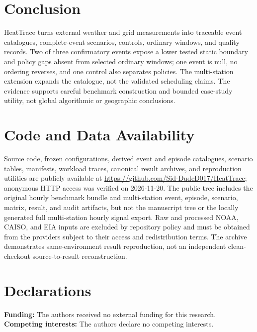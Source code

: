 \documentclass[pdflatex,sn-mathphys-num]{sn-jnl}
\begin{document}
\section{Conclusion}\label{sec:conclusion}

HeatTrace turns external weather and grid measurements into traceable event catalogues, complete-event scenarios, controls, ordinary windows, and quality records. Two of three confirmatory events expose a lower tested static boundary and policy gaps absent from selected ordinary windows; one event is null, no ordering reverses, and one control also separates policies. The multi-station extension expands the catalogue, not the validated scheduling claims. The evidence supports careful benchmark construction and bounded case-study utility, not global algorithmic or geographic conclusions.

\section*{Code and Data Availability}

Source code, frozen configurations, derived event and episode catalogues, scenario tables, manifests, workload traces, canonical result archives, and reproduction utilities are publicly available at \url{https://github.com/Sid-DudeD017/HeatTrace}; anonymous HTTP access was verified on 2026-11-20. The public tree includes the original hourly benchmark bundle and multi-station event, episode, scenario, matrix, result, and audit artifacts, but not the manuscript tree or the locally generated full multi-station hourly signal export. Raw and processed NOAA, CAISO, and EIA inputs are excluded by repository policy and must be obtained from the providers subject to their access and redistribution terms. The archive demonstrates same-environment result reproduction, not an independent clean-checkout source-to-result reconstruction.

\section*{Declarations}
\textbf{Funding:} The authors received no external funding for this research.
\textbf{Competing interests:} The authors declare no competing interests.

\clearpage

\end{document}
